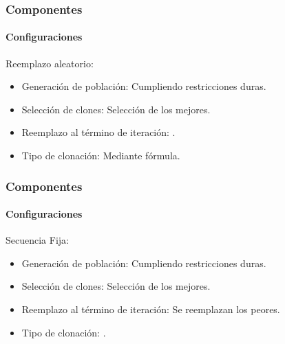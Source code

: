 \frame
{
\frametitle{Componentes}
\framesubtitle{Configuraciones}
Reemplazo aleatorio:

        \begin{itemize}
            \item Generación de población: Cumpliendo restricciones duras.
            \item Selección de clones: Selección de los mejores.
            \item Reemplazo al término de iteración:  .
            \item Tipo de clonación: Mediante fórmula.
        \end{itemize}
}
\frame
{
\frametitle{Componentes}
\framesubtitle{Configuraciones}
Secuencia Fija:

        \begin{itemize}
            \item Generación de población: Cumpliendo restricciones duras.
            \item Selección de clones: Selección de los mejores.
            \item Reemplazo al término de iteración:  Se reemplazan los peores.
            \item Tipo de clonación: .
        \end{itemize}

}


